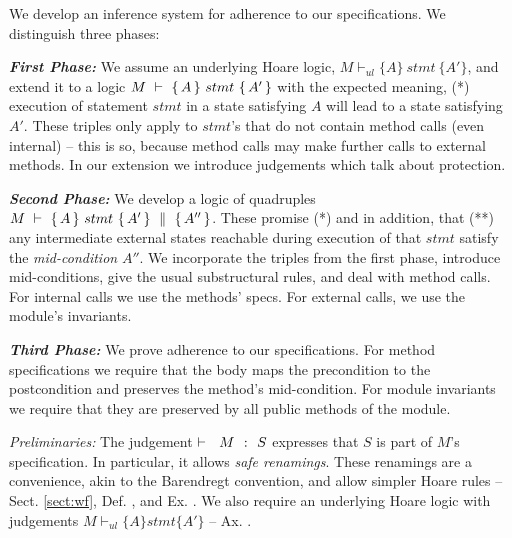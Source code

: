 We   develop  an inference system for adherence to our specifications.
 We distinguish three phases:
 
\vspace{.05cm}
\textit{\textbf{First Phase:}} We assume  an underlying Hoare logic, ${M \vdash_{ul}  \{A\} {\ stmt\ } \{A'\} }$, and extend it to a logic  %
  ${\hproves{M}  {A} {\ stmt\ }{A'} }$  with %
the expected meaning, \ie 
(*) execution of statement $stmt$ in a state satisfying %
$A$ will lead to a state satisfying  %
$A'$.
These triples only apply to   $stmt$'s  that  do not contain method calls  (even internal) -- this is so, because method calls may make further calls to   external methods.
In our extension we  introduce   judgements   which 
talk about protection.

\vspace{.05cm}

\textit{\textbf{Second Phase:}} We develop a logic of quadruples ${M\ \vdash\ \{\,A\, \} \ stmt\  \{\,A'\, \}\, \,\parallel\,\, \{\, A'' \, \}}$. These promise  (*) and  
in addition,   that (**) any intermediate external states reachable during execution of that $stmt$
 satisfy the \emph{mid-condition}  $A''$.  
 We incorporate the triples from the first phase,       
introduce  mid-conditions, give the usual substructural rules, and deal with method calls. 
For internal   calls we use the methods' specs. %
For external   calls, we   use %
 the module's invariants. 
 
 \vspace{.05cm}
 
\textit{\textbf{Third Phase:} } We prove adherence  to  our specifications. 
For method specifications we require that the body maps the precondition to the postcondition and preserves the method's  mid-condition. 
For module invariants we require that they  are preserved by all public methods of the module.

 \vspace{.1cm}

\noindent
\textit{Preliminaries:}  
 The judgement    ${{\vdash \ \ M\ \ \mathbf{:}\ \ S}}$ expresses that $S$ is part of $M$'s specification.  
In particular, it allows   \emph{safe  renamings}. 
These renamings are   a convenience, akin to the Barendregt convention, and  allow simpler Hoare rules  -- \cf Sect. \ref{sect:wf},
Def. , and Ex. . 
We also require an underlying Hoare logic with judgements $M \vdash_{ul} \{ A \} stmt \{ A' \}$ 
-- \cf Ax. .



